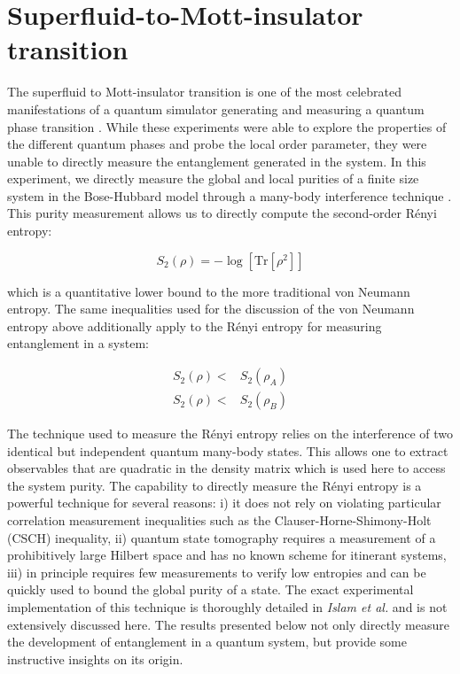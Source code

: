 \section{Superfluid-to-Mott-insulator transition}
\label{sec:sfmi}

The superfluid to Mott-insulator transition is one of the most celebrated manifestations of a quantum simulator generating and measuring a quantum phase transition \cite{Greiner2002,Bakr2010,Sachdev2011}. While these experiments were able to explore the properties of the different quantum phases and probe the local order parameter, they were unable to directly measure the entanglement generated in the system. In this experiment, we directly measure the global and local purities of a finite size system in the Bose-Hubbard model through a many-body interference technique \cite{Ekert2002,Moura2004,Palmer2005,Daley2012,Kaufman2014,Islam2015,Kaufman2016}. This purity measurement allows us to directly compute the second-order R\'enyi entropy:

\begin{equation}
\label{eqn:s2}
S_2 (\rho) = -\log [ \mathrm{Tr} [\rho^2] ]
\end{equation}

 which is a quantitative lower bound to the more traditional von Neumann entropy. The same inequalities used for the discussion of the von Neumann entropy above additionally apply to the R\'enyi entropy for measuring entanglement in a system: 
 
 \begin{eqnarray}
 S_2 (\rho) < & S_2 (\rho_A) \\
 S_2(\rho)  < & S_2 (\rho_B)
 \end{eqnarray}

The technique used to measure the R\'enyi entropy relies on the interference of two identical but independent quantum many-body states. This allows one to extract observables that are quadratic in the density matrix which is used here to access the system purity\cite{Ekert2002,Moura2004,Bruni2004,Palmer2005,Bovino2005,Walborn2006,Schmid2008,Daley2012}. The capability to directly measure the R\'enyi entropy is a powerful technique for several reasons: i) it does not rely on violating particular correlation measurement inequalities such as the Clauser-Horne-Shimony-Holt (CSCH) inequality\cite{Horodecki1996,Bovino2005}, ii) quantum state tomography requires a measurement of a prohibitively large Hilbert space and has no known scheme for itinerant systems, iii) in principle requires few measurements to verify low entropies and can be quickly used to bound the global purity of a state. The exact experimental implementation of this technique is thoroughly detailed in \emph{Islam et al.}\cite{Islam2015, Preiss2015, Lukin2018Th} and is not extensively discussed here. The results presented below not only directly measure the development of entanglement in a quantum system, but provide some instructive insights on its origin.

